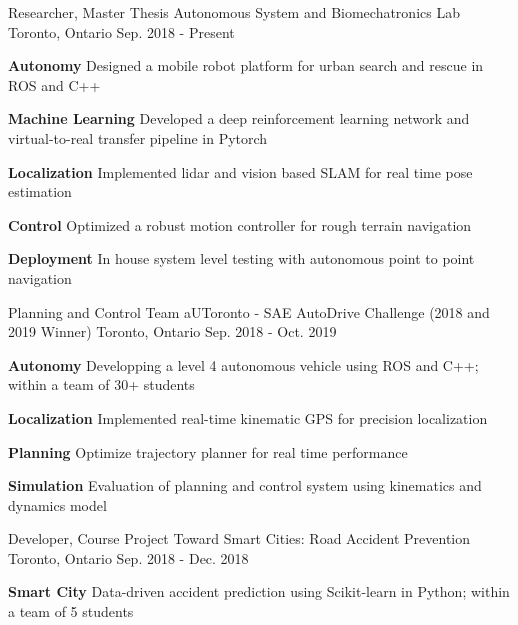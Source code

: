 \begin{cventries}
	\cventry
	{Researcher, Master Thesis}
	{Autonomous System and Biomechatronics Lab}
	{Toronto, Ontario}
	{Sep. 2018 - Present}
	{
		\begin{cvitems}
			\item {
				\textbf{Autonomy} Designed a mobile robot platform for urban search and rescue in ROS and C++
			}
			\item {
				\textbf{Machine Learning} Developed a deep reinforcement learning network and virtual-to-real transfer pipeline in Pytorch
			}
			\item {
				\textbf{Localization} Implemented lidar and vision based SLAM for real time pose estimation
			}
			\item {
				\textbf{Control} Optimized a robust motion controller for rough terrain navigation
			}
			\item {
				\textbf{Deployment} In house system level testing with autonomous point to point navigation
			}
		\end{cvitems}
	}
	\cventry
	{Planning and Control Team}
	{aUToronto - SAE AutoDrive Challenge (2018 and 2019 Winner)}
	{Toronto, Ontario}
	{Sep. 2018 - Oct. 2019}
	{
		\begin{cvitems}
			\item {\textbf{Autonomy} Developping a level 4 autonomous vehicle using ROS and C++; within a team of 30+ students}
			\item {\textbf{Localization} Implemented real-time kinematic GPS for precision localization
			}
			\item {\textbf{Planning} Optimize trajectory planner for real time performance		
			}
			\item {\textbf{Simulation} Evaluation of planning and control system using kinematics and dynamics model
			}
		\end{cvitems}
	}	
	\cventry
	{Developer, Course Project}
	{Toward Smart Cities: Road Accident Prevention}
	{Toronto, Ontario}
	{Sep. 2018 - Dec. 2018}
	{
		\begin{cvitems}
			\item {\textbf{Smart City} Data-driven accident prediction using Scikit-learn in Python; within a team of 5 students}

\end{cvitems}}
\end{cventries}
